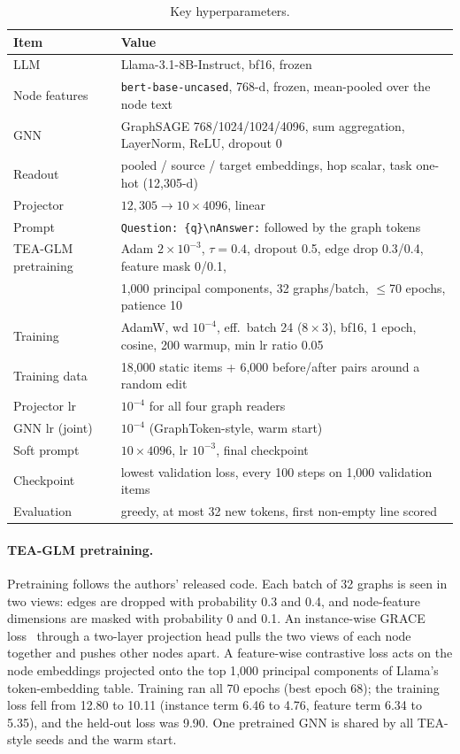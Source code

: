 \documentclass[11pt]{article}
\begin{document}
\begin{table}[t]
\centering
\small
\begin{tabular}{@{}ll@{}}
\toprule
\textbf{Item} & \textbf{Value} \\
\midrule
LLM & Llama-3.1-8B-Instruct, bf16, frozen \\
Node features & \texttt{bert-base-uncased}, 768-d, frozen, mean-pooled over the node text \\
GNN & GraphSAGE 768/1024/1024/4096, sum aggregation, LayerNorm, ReLU, dropout 0 \\
Readout & pooled / source / target embeddings, hop scalar, task one-hot (12{,}305-d) \\
Projector & $12{,}305\to10\times4096$, linear \\
Prompt & \texttt{Question: \{q\}\textbackslash nAnswer:} followed by the graph tokens \\
TEA-GLM pretraining & Adam $2{\times}10^{-3}$, $\tau{=}0.4$, dropout 0.5, edge drop 0.3/0.4, feature mask 0/0.1, \\
 & 1{,}000 principal components, 32 graphs/batch, $\leq$70 epochs, patience 10 \\
Training & AdamW, wd $10^{-4}$, eff.\ batch 24 ($8\times3$), bf16, 1 epoch, cosine, 200 warmup, min lr ratio 0.05 \\
Training data & 18{,}000 static items + 6{,}000 before/after pairs around a random edit \\
Projector lr & $10^{-4}$ for all four graph readers \\
GNN lr (joint) & $10^{-4}$ (GraphToken-style, warm start) \\
Soft prompt & $10\times4096$, lr $10^{-3}$, final checkpoint \\
Checkpoint & lowest validation loss, every 100 steps on 1{,}000 validation items \\
Evaluation & greedy, at most 32 new tokens, first non-empty line scored \\
\bottomrule
\end{tabular}
\caption{Key hyperparameters.}
\label{tab:hparams}
\end{table}

\paragraph{TEA-GLM pretraining.}
Pretraining follows the authors' released code.
Each batch of 32 graphs is seen in two views: edges are dropped with probability 0.3 and 0.4, and node-feature dimensions are masked with probability 0 and 0.1.
An instance-wise GRACE loss~\cite{zhu2020grace} through a two-layer projection head pulls the two views of each node together and pushes other nodes apart.
A feature-wise contrastive loss acts on the node embeddings projected onto the top 1{,}000 principal components of Llama's token-embedding table.
Training ran all 70 epochs (best epoch 68); the training loss fell from 12.80 to 10.11 (instance term 6.46 to 4.76, feature term 6.34 to 5.35), and the held-out loss was 9.90.
One pretrained GNN is shared by all TEA-style seeds and the warm start.
\end{document}
